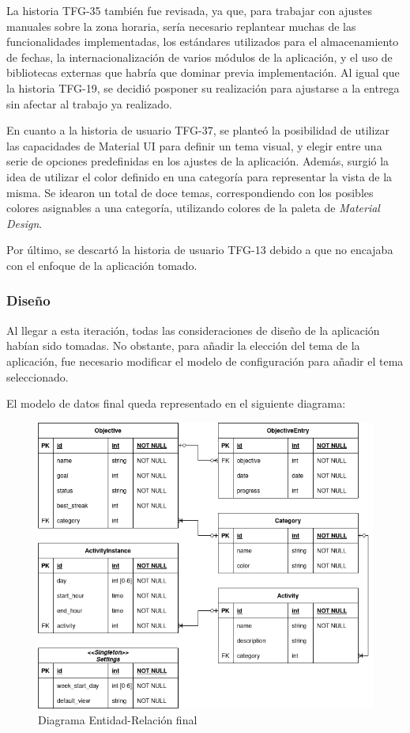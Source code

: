 \documentclass[10pt, a4paper]{aqademic}
\begin{document}
La historia TFG-35 también fue revisada, ya que, para trabajar con ajustes manuales sobre la zona horaria, sería necesario replantear muchas de las funcionalidades implementadas, los estándares utilizados para el almacenamiento de fechas, la internacionalización de varios módulos de la aplicación, y el uso de bibliotecas externas que habría que dominar previa implementación. Al igual que la historia TFG-19, se decidió posponer su realización para ajustarse a la entrega sin afectar al trabajo ya realizado.

En cuanto a la historia de usuario TFG-37, se planteó la posibilidad de utilizar las capacidades de Material UI para definir un tema visual, y elegir entre una serie de opciones predefinidas en los ajustes de la aplicación. Además, surgió la idea de utilizar el color definido en una categoría para representar la vista de la misma. Se idearon un total de doce temas, correspondiendo con los posibles colores asignables a una categoría, utilizando colores de la paleta de \textit{Material Design}.

Por último, se descartó la historia de usuario TFG-13 debido a que no encajaba con el enfoque de la aplicación tomado.

\subsubsection{Diseño}

Al llegar a esta iteración, todas las consideraciones de diseño de la aplicación habían sido tomadas. No obstante, para añadir la elección del tema de la aplicación, fue necesario modificar el modelo de configuración para añadir el tema seleccionado.

El modelo de datos final queda representado en el siguiente diagrama:

\begin{figure}[hbt!]
	\centering
	\includegraphics[scale=0.6]{img/sprint5-modelo-datos.png}
	\caption{Diagrama Entidad-Relación final}
\end{figure}
\end{document}
